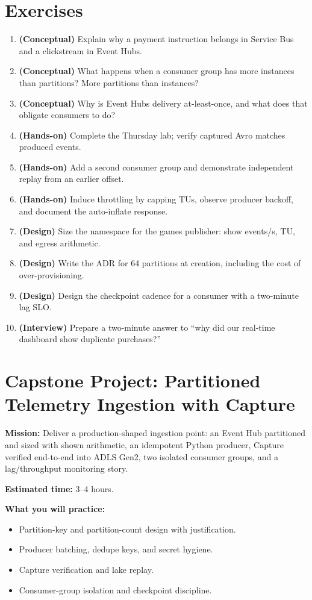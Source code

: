 \section{Exercises}
\begin{enumerate}
    \item \textbf{(Conceptual)} Explain why a payment instruction belongs in Service Bus and a clickstream in Event Hubs.
    \item \textbf{(Conceptual)} What happens when a consumer group has more instances than partitions? More partitions than instances?
    \item \textbf{(Conceptual)} Why is Event Hubs delivery at-least-once, and what does that obligate consumers to do?
    \item \textbf{(Hands-on)} Complete the Thursday lab; verify captured Avro matches produced events.
    \item \textbf{(Hands-on)} Add a second consumer group and demonstrate independent replay from an earlier offset.
    \item \textbf{(Hands-on)} Induce throttling by capping TUs, observe producer backoff, and document the auto-inflate response.
    \item \textbf{(Design)} Size the namespace for the games publisher: show events/s, TU, and egress arithmetic.
    \item \textbf{(Design)} Write the ADR for 64 partitions at creation, including the cost of over-provisioning.
    \item \textbf{(Design)} Design the checkpoint cadence for a consumer with a two-minute lag SLO.
    \item \textbf{(Interview)} Prepare a two-minute answer to ``why did our real-time dashboard show duplicate purchases?''
\end{enumerate}

\section{Capstone Project: Partitioned Telemetry Ingestion with Capture}\label{sec:ch13-capstone}

\begin{capstonebox}
\textbf{Mission:} Deliver a production-shaped ingestion point: an Event Hub partitioned and sized with shown arithmetic, an idempotent Python producer, Capture verified end-to-end into ADLS Gen2, two isolated consumer groups, and a lag/throughput monitoring story.

\textbf{Estimated time:} 3--4 hours.

\textbf{What you will practice:}
\begin{itemize}
    \item Partition-key and partition-count design with justification.
    \item Producer batching, dedupe keys, and secret hygiene.
    \item Capture verification and lake replay.
    \item Consumer-group isolation and checkpoint discipline.
\end{itemize}
\end{capstonebox}

